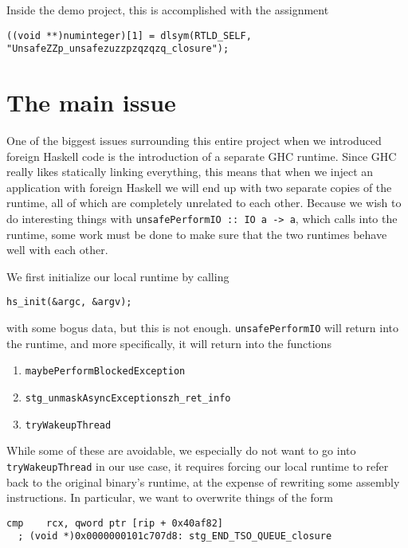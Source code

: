 \documentclass[letterpaper]{article}
\begin{document}
Inside the demo project, this is accomplished with the assignment

\begin{verbatim}
((void **)numinteger)[1] = dlsym(RTLD_SELF, "UnsafeZZp_unsafezuzzpzqzqzq_closure");
\end{verbatim}

\section{The main issue}

One of the biggest issues surrounding this entire project when we introduced
foreign Haskell code is the introduction of a separate GHC runtime. Since GHC
really likes statically linking everything, this means that when we inject an
application with foreign Haskell we will end up with two separate copies of the
runtime, all of which are completely unrelated to each other. Because we wish to
do interesting things with \texttt{unsafePerformIO :: IO a -> a},
which calls into the runtime, some work must be done to make sure that the two
runtimes behave well with each other.

We first initialize our local runtime by calling

\begin{verbatim}
hs_init(&argc, &argv);
\end{verbatim}

with some bogus data, but this is not enough.
\texttt{unsafePerformIO} will return into the runtime, and more
specifically, it will return into the functions

\begin{enumerate}[1.]
\item
\texttt{maybePerformBlockedException}
\item
\texttt{stg_unmaskAsyncExceptionszh_ret_info}
\item
\texttt{tryWakeupThread}
\end{enumerate}

While some of these are avoidable, we especially do not want to go into
\texttt{tryWakeupThread} in our use case, it requires forcing our local
runtime to refer back to the original binary's runtime, at the expense of
rewriting some assembly instructions. In particular, we want to overwrite things
of the form

\begin{verbatim}
cmp    rcx, qword ptr [rip + 0x40af82]
  ; (void *)0x0000000101c707d8: stg_END_TSO_QUEUE_closure
\end{verbatim}
\end{document}
